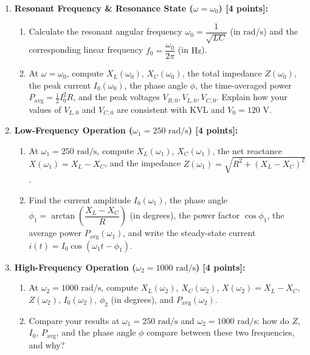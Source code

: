 \documentclass[10pt,letterpaper]{article}
\begin{document}
\begin{enumerate}
  \item \textbf{Resonant Frequency \& Resonance State ($\omega = \omega_0$) [4 points]:}
    \begin{enumerate}
      \item Calculate the resonant angular frequency $\omega_0 = \dfrac{1}{\sqrt{LC}}$ (in $\text{rad/s}$) and the corresponding linear frequency $f_0 = \dfrac{\omega_0}{2\pi}$ (in $\text{Hz}$).
      \item At $\omega = \omega_0$, compute $X_L(\omega_0)$, $X_C(\omega_0)$, the total impedance $Z(\omega_0)$, the peak current $I_0(\omega_0)$, the phase angle $\phi$, the time-averaged power $P_{\text{avg}} = \frac{1}{2}I_0^2 R$, and the peak voltages $V_{R,0}, V_{L,0}, V_{C,0}$. Explain how your values of $V_{L,0}$ and $V_{C,0}$ are consistent with KVL and $V_0 = 120\text{ V}$.
    \end{enumerate}
  
  \item \textbf{Low-Frequency Operation ($\omega_1 = 250\text{ rad/s}$) [4 points]:}
    \begin{enumerate}
      \item At $\omega_1 = 250\text{ rad/s}$, compute $X_L(\omega_1)$, $X_C(\omega_1)$, the net reactance $X(\omega_1) = X_L - X_C$, and the impedance $Z(\omega_1) = \sqrt{R^2 + (X_L - X_C)^2}$.
      \item Find the current amplitude $I_0(\omega_1)$, the phase angle $\phi_1 = \arctan\left(\dfrac{X_L - X_C}{R}\right)$ (in degrees), the power factor $\cos\phi_1$, the average power $P_{\text{avg}}(\omega_1)$, and write the steady-state current $i(t) = I_0\cos(\omega_1 t - \phi_1)$.
    \end{enumerate}
  
  \item \textbf{High-Frequency Operation ($\omega_2 = 1000\text{ rad/s}$) [4 points]:}
    \begin{enumerate}
      \item At $\omega_2 = 1000\text{ rad/s}$, compute $X_L(\omega_2)$, $X_C(\omega_2)$, $X(\omega_2) = X_L - X_C$, $Z(\omega_2)$, $I_0(\omega_2)$, $\phi_2$ (in degrees), and $P_{\text{avg}}(\omega_2)$.
      \item Compare your results at $\omega_1 = 250\text{ rad/s}$ and $\omega_2 = 1000\text{ rad/s}$: how do $Z$, $I_0$, $P_{\text{avg}}$, and the phase angle $\phi$ compare between these two frequencies, and why?
    \end{enumerate}
  
\end{enumerate}
\vspace{1.2in}
\end{document}

